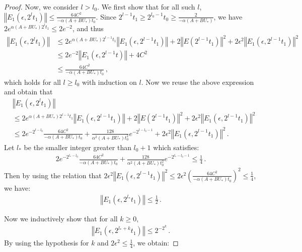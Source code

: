 \documentclass{article}
\theoremstyle{definition}
\begin{document}
\begin{proof}
Now, we consider $l>l_{0}$. We first show that for all such $l$, $\left\Vert E_{1}(\epsilon, 2^{l}t_{1})\right\Vert \leq \frac{64C^{2}}{-\alpha(A+BU_{*})t_{0}}$. Since $2^{l-1}t_{1}\geq 2^{l_{0}-1}t_{0}\geq \frac{2}{-\alpha(A+BU_{*})}$, we have $2e^{\alpha(A+BU_{*})2^{l}t_{1}}\leq 2e^{-2}$, and thus
\begin{align*}
\left\Vert E_{1}(\epsilon,2^{l}t_{1})\right\Vert  &\leq 2e^{\alpha(A+BU_{*})2^{l-1}t_{1}}\left\Vert E_{1}(\epsilon,2^{l-1}t_{1})\right\Vert +2\left\Vert E(2^{l-1}t_{1})\right\Vert ^{2}+2\epsilon^{2}\left\Vert E_{1}(\epsilon,2^{l-1}t_{1})\right\Vert ^{2} \\
&\leq 2e^{-2}\left\Vert E_{1}(\epsilon,2^{l-1}t)\right\Vert  +4C^{2}\\&\leq \frac{64C^{2}}{-\alpha(A+BU_{*})t_{0}}\,,
\end{align*}
which holds for all $l\geq l_{0}$ with induction on $l$. Now we reuse the above expression and obtain that
\begin{align*}
&\left\Vert E_{1}(\epsilon,2^{l}t_{1})\right\Vert  
\\&\leq 2e^{\alpha(A+BU_{*})2^{l-1}t_{1}}\left\Vert E_{1}(\epsilon,2^{l-1}t_{1})\right\Vert +2\left\Vert E(2^{l-1}t_{1})\right\Vert ^{2}+2\epsilon^{2}\left\Vert E_{1}(\epsilon,2^{l-1}t_{1})\right\Vert ^{2} \\
&\leq 2e^{-2^{l-l_{0}}}\frac{64C^{2}}{-\alpha(A+BU_{*})t_{0}}+\frac{128}{\alpha^{2}(A+BU_{*})t^{2}_{0}}e^{-2^{l-l_{0}-1}}+2\epsilon^{2}\left\Vert E_{1}(\epsilon,2^{l-1}t_{1})\right\Vert ^{2}\,.
\end{align*}
Let $l_{*}$ be the smaller integer greater than $l_{0}+1$ which satisfies: 
\begin{align*}
2e^{-2^{l_{*}-l_{0}}}\frac{64C^{2}}{-\alpha(A+BU_{*})t_{0}}+\frac{128}{\alpha^{2}(A+BU_{*})t^{2}_{0}}e^{-2^{l_{*}-l_{0}-1}}\leq \frac{1}{4}\,.
\end{align*}
Then by using the relation that $2\epsilon^{2}\left\Vert E_{1}(\epsilon,2^{l-1}t_{1})\right\Vert ^{2}\leq 2\epsilon^{2}\left(\frac{64C^{2}}{-\alpha(A+BU_{*})t_{0}}\right)^{2}\leq\frac{1}{4}$, we have:
\begin{align*}
    \left\Vert E_{1}(\epsilon,2^{l_{*}}t_{1})\right\Vert\leq \frac{1}{2}\,.
\end{align*}

Now we inductively show that for all $k\geq 0$, 
\begin{align*}
\left\Vert E_{1}(\epsilon,2^{l_{*}+k}t_{1})\right\Vert\leq2^{-2^{k}}\,.
\end{align*}
By using the hypothesis for $k$ and $2\epsilon^{2}\leq\frac{1}{4}$, we obtain:


\end{proof}
\end{document}
